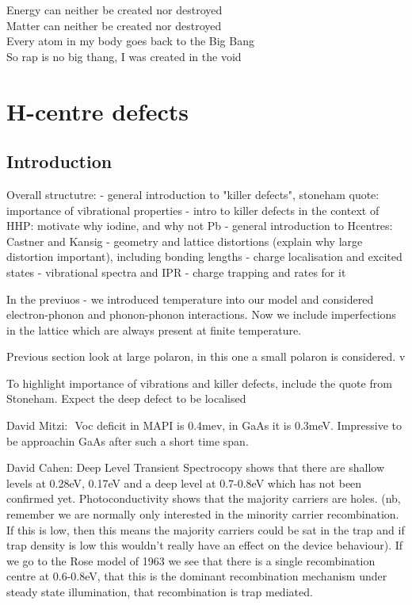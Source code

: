 \begin{savequote}[8cm]
Energy can neither be created nor destroyed \\
Matter can neither be created nor destroyed \\
Every atom in my body goes back to the Big Bang \\
So rap is no big thang, I was created in the void
\end{savequote}

\chapter{\label{ch:6-defects}H-centre defects}

\section{Introduction}

Overall structutre: 
- general introduction to "killer defects", stoneham quote: importance of vibrational properties
- intro to killer defects in the context of HHP: motivate why iodine, and why not Pb
- general introduction to Hcentres: Castner and Kansig
- geometry and lattice distortions (explain why large distortion important), including bonding lengths
- charge localisation and excited states
- vibrational spectra and IPR
- charge trapping and rates for it

In the previuos - we introduced temperature into our model and considered electron-phonon and phonon-phonon interactions. Now we include imperfections in the lattice which are always present at finite temperature.

Previous section look at large polaron, in this one a small polaron is considered.
 v

 To highlight importance of vibrations and killer defects, include the quote from Stoneham. Expect the deep defect to be localised

David Mitzi: 
Voc deficit in MAPI is 0.4mev, in GaAs it is 0.3meV. Impressive to be approachin GaAs after such a short time span.


David Cahen: Deep Level Transient Spectrocopy shows that there are shallow levels at 0.28eV, 0.17eV and a deep level at 0.7-0.8eV which has not been confirmed yet.
Photoconductivity shows that the majority carriers are holes. (nb, remember we are normally only interested in the minority carrier recombination. If this is low, then this means the majority carriers could be sat in the trap and if trap density is low this wouldn’t really have an effect on the device behaviour).
If we go to the Rose model of 1963 we see that there is a single recombination centre at 0.6-0.8eV, that this is the dominant recombination mechanism under steady state illumination, that recombination is trap mediated. 

